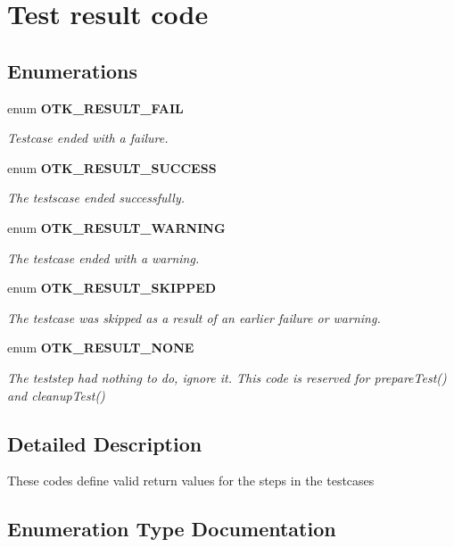 \section{Test result code}
\label{group__Test__Results}
\subsection*{Enumerations}
\begin{DoxyCompactItemize}
\item 
enum {\bf OTK\_\-RESULT\_\-FAIL} 
\begin{DoxyCompactList}\small\item\em Testcase ended with a failure. \end{DoxyCompactList}\item 
enum {\bf OTK\_\-RESULT\_\-SUCCESS} 
\begin{DoxyCompactList}\small\item\em The testscase ended successfully. \end{DoxyCompactList}\item 
enum {\bf OTK\_\-RESULT\_\-WARNING} 
\begin{DoxyCompactList}\small\item\em The testcase ended with a warning. \end{DoxyCompactList}\item 
enum {\bf OTK\_\-RESULT\_\-SKIPPED} 
\begin{DoxyCompactList}\small\item\em The testcase was skipped as a result of an earlier failure or warning. \end{DoxyCompactList}\item 
enum {\bf OTK\_\-RESULT\_\-NONE} 
\begin{DoxyCompactList}\small\item\em The teststep had nothing to do, ignore it. This code is reserved for prepareTest() and cleanupTest() \end{DoxyCompactList}\end{DoxyCompactItemize}


\subsection{Detailed Description}
These codes define valid return values for the steps in the testcases 

\subsection{Enumeration Type Documentation}
